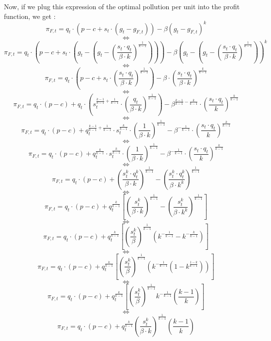 \documentclass{article}
\begin{document}
Now, if we plug this expression of the optimal pollution per unit into the profit function, we get : 
$$\pi_{F,t}=q_{t}\cdot\left(p-c+s_{t}\cdot(g_{t}-g_{F,t})\right)-\beta(g_{t}-g_{F,t})^{k}$$
$$\iff$$
$$\pi_{F,t}=q_{t}\cdot\left(p-c+s_{t}\cdot\left(g_{t}-\left(g_{t}-\left(\frac{s_{t}\cdot q_{t}}{\beta\cdot k}\right)^{\frac{1}{k-1}}\right)\right)\right)-\beta\left(g_{t}-\left(g_{t}-\left(\frac{s_{t}\cdot q_{t}}{\beta\cdot k}\right)^{\frac{1}{k-1}}\right)\right)^{k}$$
$$\iff$$
$$\pi_{F,t}=q_{t}\cdot\left(p-c+s_{t}\cdot\left(\frac{s_{t}\cdot q_{t}}{\beta\cdot k}\right)^{\frac{1}{k-1}}\right)-\beta\cdot\left(\frac{s_{t}\cdot q_{t}}{\beta\cdot k}\right)^{\frac{k}{k-1}}$$
$$\iff$$
$$\pi_{F,t}=q_{t}\cdot\left(p-c\right)+q_{t}\cdot\left(s_{t}^{\frac{k-1}{k-1}+\frac{1}{k-1}}\cdot\left(\frac{q_{t}}{\beta\cdot k}\right)^{\frac{1}{k-1}}\right)-\beta^{\frac{k-1}{k-1}-\frac{k}{k-1}}\cdot\left(\frac{s_{t}\cdot q_{t}}{k}\right)^{\frac{k}{k-1}}$$
$$\iff$$
$$\pi_{F,t}=q_{t}\cdot\left(p-c\right)+q_{t}^{\frac{k-1}{k-1}+\frac{1}{k-1}}\cdot s_{t}^{\frac{k}{k-1}}\cdot\left(\frac{1}{\beta\cdot k}\right)^{\frac{1}{k-1}}-\beta^{-\frac{1}{k-1}}\cdot\left(\frac{s_{t}\cdot q_{t}}{k}\right)^{\frac{k}{k-1}}$$
$$\iff$$
$$\pi_{F,t}=q_{t}\cdot\left(p-c\right)+q_{t}^{\frac{k}{k-1}}\cdot s_{t}^{\frac{k}{k-1}}\cdot\left(\frac{1}{\beta\cdot k}\right)^{\frac{1}{k-1}}-\beta^{-\frac{1}{k-1}}\cdot\left(\frac{s_{t}\cdot q_{t}}{k}\right)^{\frac{k}{k-1}}$$
$$\iff$$
$$\pi_{F,t}=q_{t}\cdot\left(p-c\right)+\left(\frac{s_{t}^{k}\cdot q_{t}^{k}}{\beta\cdot k}\right)^{\frac{1}{k-1}}-\left(\frac{s_{t}^{k}\cdot q_{t}^{k}}{\beta\cdot k^{k}}\right)^{\frac{1}{k-1}}$$
$$\iff$$
$$\pi_{F,t}=q_{t}\cdot\left(p-c\right)+q_{t}^{\frac{k}{k-1}}\left[\left(\frac{s_{t}^{k}}{\beta\cdot k}\right)^{\frac{1}{k-1}}-\left(\frac{s_{t}^{k}}{\beta\cdot k^{k}}\right)^{\frac{1}{k-1}}\right]$$
$$\iff$$
$$\pi_{F,t}=q_{t}\cdot\left(p-c\right)+q_{t}^{\frac{k}{k-1}}\left[\left(\frac{s_{t}^{k}}{\beta}\right)^{\frac{1}{k-1}}\left(k^{-\frac{1}{k-1}}-k^{-\frac{k}{k-1}}\right)\right]$$
$$\iff$$
$$\pi_{F,t}=q_{t}\cdot\left(p-c\right)+q_{t}^{\frac{k}{k-1}}\left[\left(\frac{s_{t}^{k}}{\beta}\right)^{\frac{1}{k-1}}\left(k^{-\frac{1}{k-1}}(1-k^{\frac{1-k}{k-1}})\right)\right]$$
$$\iff$$
$$\pi_{F,t}=q_{t}\cdot\left(p-c\right)+q_{t}^{\frac{k}{k-1}}\left[\left(\frac{s_{t}^{k}}{\beta}\right)^{\frac{1}{k-1}}k^{-\frac{1}{k-1}}\left(\frac{k-1}{k}\right)\right]$$
$$\iff$$
$$\pi_{F,t}=q_{t}\cdot\left(p-c\right)+q_{t}^{\frac{k}{k-1}}\left(\frac{s_{t}^{k}}{\beta\cdot k}\right)^{\frac{1}{k-1}}\left(\frac{k-1}{k}\right)$$
\end{document}

